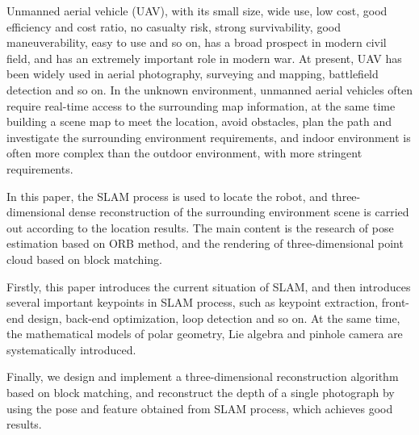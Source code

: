 \begin{enabstract}
Unmanned aerial vehicle (UAV), with its small size, wide use, low cost, good efficiency and cost ratio, no casualty risk, strong survivability, good maneuverability, easy to use and so on, has a broad prospect in modern civil field, and has an extremely important role in modern war. At present, UAV has been widely used in aerial photography, surveying and mapping, battlefield detection and so on. In the unknown environment, unmanned aerial vehicles often require real-time access to the surrounding map information, at the same time building a scene map to meet the location, avoid obstacles, plan the path and investigate the surrounding environment requirements, and indoor environment is often more complex than the outdoor environment, with more stringent requirements.
\par
In this paper, the SLAM process is used to locate the robot, and three-dimensional dense reconstruction of the surrounding environment scene is carried out according to the location results. The main content is the research of pose estimation based on ORB method, and the rendering of three-dimensional point cloud based on block matching. \par
Firstly, this paper introduces the current situation of SLAM, and then introduces several important keypoints in SLAM process, such as keypoint extraction, front-end design, back-end optimization, loop detection and so on. At the same time, the mathematical models of polar geometry, Lie algebra and pinhole camera are systematically introduced.\par
Finally, we design and implement a three-dimensional reconstruction algorithm based on block matching, and reconstruct the depth of a single photograph by using the pose and feature obtained from SLAM process, which achieves good results.\par
{}
\end{enabstract}
